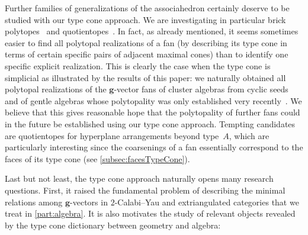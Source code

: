 \documentclass{amsart}
\theoremstyle{definition}
\renewcommand{\b}[1]{{\boldsymbol{#1}}} %
\begin{document}
\smallskip
Further families of generalizations of the associahedron certainly deserve to be studied with our type cone approach.
We are investigating in particular brick polytopes~\cite{PilaudSantos-brickPolytope, PilaudStump-brickPolytope} and quotientopes~\cite{Reading-latticeCongruences, Reading-CambrianLattices, PilaudSantos-quotientopes}.
In fact, as already mentioned, it seems sometimes easier to find all polytopal realizations of a fan (by describing its type cone in terms of certain specific pairs of adjacent maximal cones) than to identify one specific explicit realization.
This is clearly the case when the type cone is simplicial as illustrated by the results of this paper: we naturally obtained all polytopal realizations of the $\b{g}$-vector fans of cluster algebras from cyclic seeds and of gentle algebras whose polytopality was only established very recently~\cite{HohlwegPilaudStella, PaluPilaudPlamondon-nonkissing}.
We believe that this gives reasonable hope that the polytopality of further fans could in the future be established using our type cone approach.
Tempting candidates are quotientopes for hyperplane arrangements beyond type~$A$, which are particularly interesting since the coarsenings of a fan essentially correspond to the faces of its type cone (see \cref{subsec:facesTypeCone}).

\medskip
Last but not least, the type cone approach naturally opens many research questions.
First, it raised the fundamental problem of describing the minimal relations among $\b{g}$-vectors in $2$-Calabi--Yau and extriangulated categories that we treat in \cref{part:algebra}.
It is also motivates the study of relevant objects revealed by the type cone dictionary between geometry and algebra:
\end{document}
